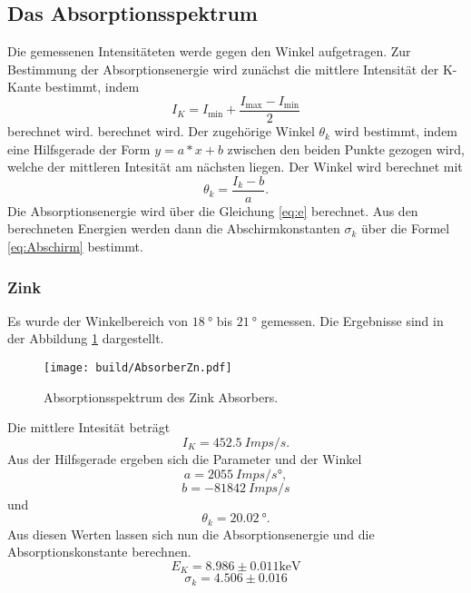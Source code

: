 \subsection{Das Absorptionsspektrum}
Die gemessenen Intensitäteten werde gegen den Winkel aufgetragen.
Zur Bestimmung der Absorptionsenergie wird zunächst die mittlere Intensität der K-Kante bestimmt, indem 
\begin{equation}
    I_K = I_\text{min} + \frac{I_\text{max}- I_\text{min}}{2}
\end{equation}
berechnet wird.
\noindent berechnet wird. 
Der zugehörige Winkel $\theta_k$ wird bestimmt, indem eine Hilfsgerade der Form $y = a * x + b$ zwischen den beiden Punkte gezogen wird, welche der mittleren Intesität am nächsten liegen.
Der Winkel wird berechnet mit 
\begin{equation}
    \theta_k = \frac{I_k - b}{a}.
\end{equation}
Die Absorptionsenergie wird über die Gleichung \ref{eq:e} berechnet.
Aus den berechneten Energien werden dann die Abschirmkonstanten $\sigma_k$ über die Formel \ref{eq:Abschirm} bestimmt.


\subsubsection{Zink}
Es wurde der Winkelbereich von $\qty{18}{°}$ bis $\qty{21}{°}$ gemessen. 
Die Ergebnisse sind in der Abbildung \ref{fig:AbZn} dargestellt.
\begin{figure}[H]
    \centering
    \texttt{[image: build/AbsorberZn.pdf]}
    \caption{Absorptionsspektrum des Zink Absorbers.}
    \label{fig:AbZn}
\end{figure}
Die mittlere Intesität beträgt
\begin{equation*}
    I_K = \qty{452.5}{Imps/s}.
\end{equation*}
Aus der Hilfsgerade ergeben sich die Parameter und der Winkel
\begin{equation*}
    a = \qty{2055}{Imps/s°} ,
\end{equation*}
\begin{equation*}
    b = \qty{-81842}{Imps/s}
\end{equation*}
und
\begin{equation*}
    \theta_k = \qty{20.02}{°}.
\end{equation*}
Aus diesen Werten lassen sich nun die Absorptionsenergie und die Absorptionskonstante berechnen.
\begin{equation*}
    E_K = 8.986 \pm 0.011\unit{\kilo\electronvolt}
\end{equation*}
\begin{equation*}
    \sigma_k = 4.506 \pm 0.016
\end{equation*}


